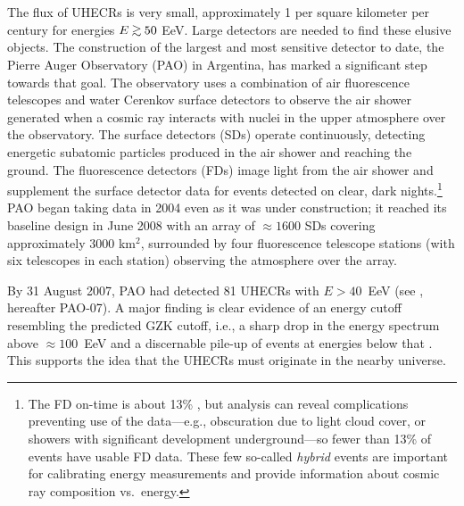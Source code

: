 The flux of UHECRs is very small, approximately 1 per square kilometer per
century for energies $E\gta 50$ EeV.  Large detectors are needed to find
these elusive objects.  The construction of the largest and most sensitive
detector to date, the Pierre Auger Observatory (PAO) \cite{PAO04-Proto}
in Argentina, has marked a significant step towards that goal.  The
observatory uses a combination of air fluorescence telescopes and water
Cerenkov surface detectors to observe the air shower generated when a cosmic
ray interacts with nuclei in the upper atmosphere over the
observatory.  The surface detectors (SDs) operate continuously, detecting
energetic subatomic particles produced in the air shower and reaching the
ground.  The fluorescence detectors (FDs) image light from the air shower and
supplement the surface detector data for events detected on clear, dark
nights.\footnote{The FD on-time is about 13\% \cite{PAO10-GZK}, but analysis
can reveal complications preventing use of the data---e.g., obscuration due to
light cloud cover, or showers with significant development underground---so
fewer than 13\% of events have usable FD data.  These few so-called {\em
hybrid} events are important for calibrating energy measurements and provide
information about cosmic ray composition vs.\ energy.}
PAO began taking data in 2004 even as it was under construction; it reached
its baseline design in June 2008 with an array of $\approx 1600$ SDs
covering approximately $3000$ km$^2$, surrounded by four
fluorescence telescope stations (with six telescopes in each station)
observing the atmosphere over the array.

By 31 August 2007, PAO had detected 81 UHECRs with $E > 40$~EeV
(see \cite{PAO07-Aniso}, hereafter PAO-07).  A major finding is clear evidence of
an energy cutoff resembling the predicted GZK cutoff, i.e., a sharp drop in
the energy spectrum above $\approx 100$~EeV and a discernable pile-up of
events at energies below that \cite{PAO10-GZK}. This supports the idea that
the UHECRs must originate in the nearby universe.

